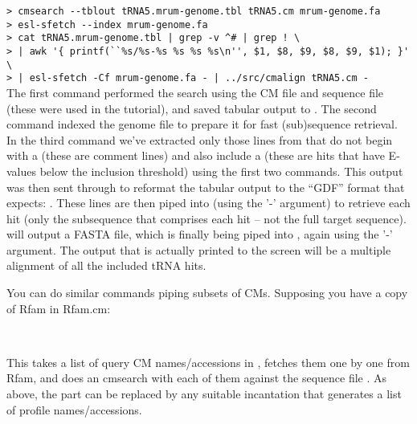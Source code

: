 \indent\indent\small\verb+> cmsearch --tblout tRNA5.mrum-genome.tbl tRNA5.cm mrum-genome.fa+ \\
\indent\indent\small\verb+> esl-sfetch --index mrum-genome.fa+ \\
\indent\indent\small\verb+> cat tRNA5.mrum-genome.tbl | grep -v ^# | grep ! \ + \\
\indent\indent\small\verb+> | awk '{ printf(``%s/%s-%s %s %s %s\n'', $1, $8, $9, $8, $9, $1); }' \ + \\
\indent\indent\small\verb+> | esl-sfetch -Cf mrum-genome.fa - | ../src/cmalign tRNA5.cm - + \\

The first command performed the search using the CM file
 and sequence file  (these
were used in the tutorial), and saved tabular output to
.  The second command indexed the genome
file to prepare it for fast (sub)sequence retrieval. In the third
command we've extracted only those lines from
 that do not begin with a \prog{\#} (these
are comment lines) and also include a \prog{!} (these are hits that
have E-values below the inclusion threshold) using the first two
 commands. This output was then sent through  to
reformat the tabular output to the ``GDF'' format that
 expects: .  These lines are then piped into  (using
the '-' argument) to retrieve each hit (only the subsequence that
comprises each hit -- not the full target sequence). 
will output a FASTA file, which is finally being piped into
, again using the '-' argument. The output that is
actually printed to the screen will be a multiple alignment of all the
included tRNA hits.

You can do similar commands piping subsets of CMs. Supposing you have a copy of Rfam in Rfam.cm:

 \\ 

This takes a list of query CM names/accessions in
, fetches them one by one from Rfam, and does an
cmsearch with each of them against the sequence file
. As above, the  part
can be replaced by any suitable incantation that generates a list of
profile names/accessions.

